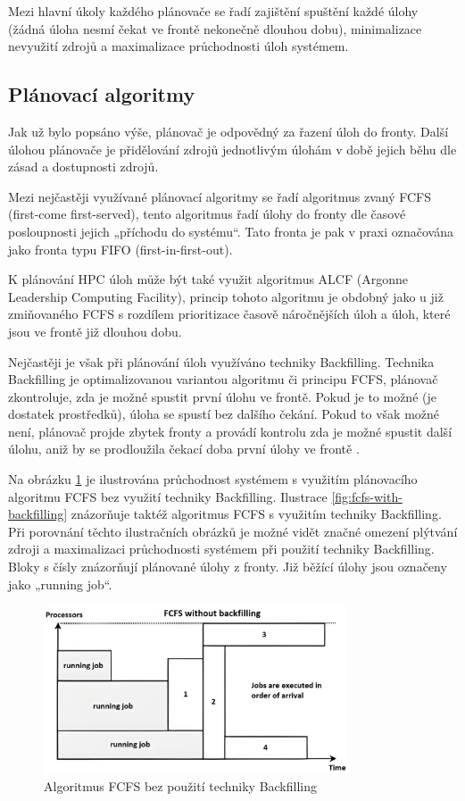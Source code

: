 Mezi hlavní úkoly každého plánovače se řadí zajištění spuštění každé úlohy (žádná úloha nesmí čekat ve frontě nekonečně dlouhou dobu), minimalizace nevyužití zdrojů a maximalizace průchodnosti úloh systémem.


\subsection{Plánovací algoritmy}
Jak už bylo popsáno výše, plánovač je odpovědný za řazení úloh do fronty. Další úlohou plánovače je přidělování zdrojů jednotlivým úlohám v době jejich běhu dle zásad a dostupnosti zdrojů. 

Mezi nejčastěji využívané plánovací algoritmy se řadí algoritmus zvaný FCFS (first-come first-served), tento algoritmus řadí úlohy do fronty dle časové posloupnosti jejich „příchodu do systému“. Tato fronta je pak v praxi označována jako fronta typu FIFO (first-in-first-out). 

K plánování HPC úloh může být také využit algoritmus ALCF (Argonne Leadership Computing Facility), princip tohoto algoritmu je obdobný jako u již zmiňovaného FCFS s rozdílem prioritizace časově náročnějších úloh a úloh, které jsou ve frontě již dlouhou dobu. 

Nejčastěji je však při plánování úloh využíváno techniky Backfilling. Technika Backfilling je optimalizovanou variantou algoritmu či principu FCFS, plánovač zkontroluje, zda je možné spustit první úlohu ve frontě. Pokud je to možné (je dostatek prostředků), úloha se spustí bez dalšího čekání. Pokud to však možné není, plánovač projde zbytek fronty a provádí kontrolu zda je možné spustit další úlohu, aniž by se prodloužila čekací doba první úlohy ve frontě \cite{pr00bfp79qnvRTQ3}.

Na obrázku \ref{fig:fcfs-without-backfilling} je ilustrována průchodnost systémem s využitím plánovacího algoritmu FCFS bez využití techniky Backfilling. Ilustrace \ref{fig:fcfs-with-backfilling} znázorňuje taktéž algoritmus FCFS s využitím techniky Backfilling. Při porovnání těchto ilustračních obrázků je možné vidět značné omezení plýtvání zdroji a maximalizaci průchodnosti systémem při použití techniky Backfilling. Bloky s čísly znázorňují plánované úlohy z fronty. Již běžící úlohy jsou označeny jako „running job“.
\newpage
\begin{figure}
	\centering
	\includegraphics[width=0.8\textwidth]{Figures/fcfs-wb.png}
	\caption{Algoritmus FCFS bez použití techniky Backfilling \cite{GomezMartin2016}}
	\label{fig:fcfs-without-backfilling}
\end{figure}

